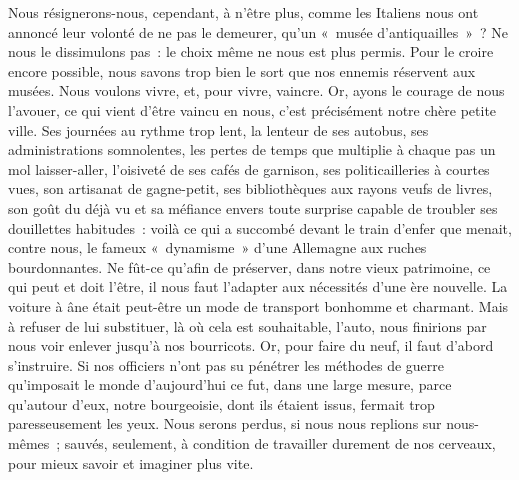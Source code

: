 \documentclass[french,twoside]{book} %
\begin{document}
Nous résignerons-nous, cependant, à n’être plus, comme les Italiens nous ont annoncé leur volonté de ne pas le demeurer, qu’un « musée d’antiquailles » ? Ne nous le dissimulons pas : le choix même ne nous est plus permis. Pour le croire encore possible, nous savons trop bien le sort que nos ennemis réservent aux musées. Nous voulons vivre, et, pour vivre, vaincre. Or, ayons le courage de nous l’avouer, ce qui vient d’être vaincu en nous, c’est précisément notre chère petite ville. Ses journées au rythme trop lent, la lenteur de ses autobus, ses administrations somnolentes, les pertes de temps que multiplie à chaque pas un mol laisser-aller, l’oisiveté de ses cafés de garnison, ses politicailleries à courtes vues, son artisanat de gagne-petit, ses bibliothèques aux rayons veufs de livres, son goût du déjà vu et sa méfiance envers toute surprise capable de troubler ses douillettes habitudes : voilà ce qui a succombé devant le train d’enfer que menait, contre nous, le fameux « dynamisme » d’une Allemagne aux ruches bourdonnantes. Ne fût-ce qu’afin de préserver, dans notre vieux patrimoine, ce qui peut et doit l’être, il nous faut l’adapter aux nécessités d’une ère nouvelle. La voiture à âne était peut-être un mode de transport bonhomme et charmant. Mais à refuser de lui substituer, là où cela est souhaitable, l’auto, nous finirions par nous voir enlever jusqu’à nos bourricots. Or, pour faire du neuf, il faut d’abord s’instruire. Si nos officiers n’ont pas su pénétrer les méthodes de guerre qu’imposait le monde d’aujourd’hui ce fut, dans une large mesure, parce qu’autour d’eux, notre bourgeoisie, dont ils étaient issus,   fermait trop paresseusement les yeux. Nous serons perdus, si nous nous replions sur nous-mêmes ; sauvés, seulement, à condition de travailler durement de nos cerveaux, pour mieux savoir et imaginer plus vite.\par
\end{document}
